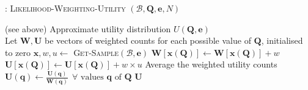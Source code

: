 \begin{algorithm}[h]
\caption{: \textsc{Likelihood-Weighting-Utility} $(\mathcal{B},\mathbf{Q}, \mathbf{e}, N)$}
\begin{algorithmic} \vspace{2mm} 
\REQUIRE (see above)
\ENSURE Approximate utility distribution $U(\mathbf{Q}, \mathbf{e})$ \\[2mm]
\STATE Let $\mathbf{W}, \mathbf{U}$ be vectors of weighted counts for each possible value of $\mathbf{Q}$, initialised to zero
\STATE $\mathbf{x}, w, u \leftarrow $ \textsc{Get-Sample}$(\mathcal{B}, \mathbf{e})$ 
\STATE $\mathbf{W}[\mathbf{x}(\mathbf{Q})] \leftarrow \mathbf{W}[\mathbf{x}(\mathbf{Q})] + w$
\STATE $\mathbf{U}[\mathbf{x}(\mathbf{Q})] \leftarrow \mathbf{U}[\mathbf{x}(\mathbf{Q})] + w \times u$
\ENDFOR
\STATE Average the weighted utility counts $\mathbf{U}(\mathbf{q}) \leftarrow \frac{\mathbf{U}(\mathbf{q})}{\mathbf{W}(\mathbf{q})} \ \ \forall \text{ values } \mathbf{q} \text{ of } \mathbf{Q}$ 
\RETURN $\mathbf{U}$  \vspace{1mm} 
\end{algorithmic}
\label{algo:lwu}
\end{algorithm}


